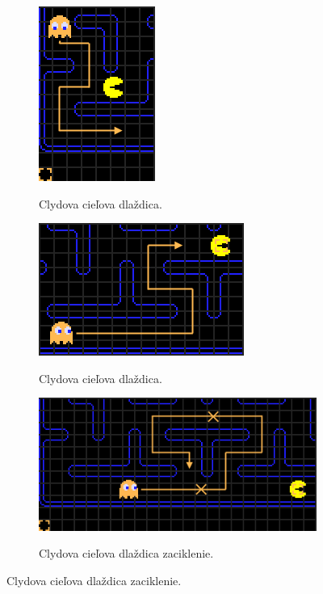 \documentclass[10pt,oneside,slovak,a4paper]{article}
\begin{document}
\begin{figure}[h!]
  \centering
  \begin{subfigure}[b]{0.4\linewidth}
    \includegraphics[scale=0.35]{clyde-targeting.png}
    \caption{Clydova cieľova dlaždica.}
\cite{2.zdroj}
  \end{subfigure}
  \begin{subfigure}[b]{0.4\linewidth}
    \includegraphics[scale=0.35]{clyde-targeting2.png}
    \caption{Clydova cieľova dlaždica.}
\cite{2.zdroj}
  \end{subfigure}
\begin{subfigure}[b]{0.4\linewidth}
    \includegraphics[scale=0.35]{clyde-targeting3.png}
    \caption{Clydova cieľova dlaždica zaciklenie.}
\cite{2.zdroj}
\label{oc}
  \end{subfigure}
\end{figure}
\newpage
\end{document}
